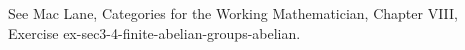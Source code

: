 See Mac Lane, Categories for the Working Mathematician, Chapter VIII, Exercise ex-sec3-4-finite-abelian-groups-abelian.
